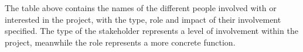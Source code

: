 The table above contains the names of the different people involved with or interested in the project, with the type, role and impact of their involvement specified. The type of the stakeholder represents a level of involvement within the project, meanwhile the role represents a more concrete function.
